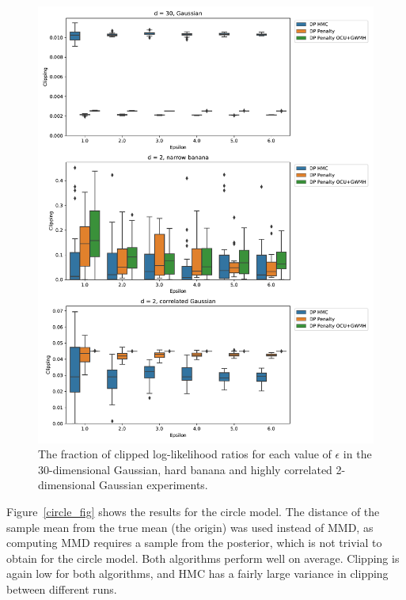 \documentclass[english,twoside,openright]{HYgraduMLDS}
\begin{document}
\begin{figure}
  \centering
  \includegraphics[width=\textwidth]{figures/banana_extra_clipping}
  \caption{
    The fraction of clipped log-likelihood ratios for each value of \(\epsilon\) in
    the 30-dimensional Gaussian, hard banana and highly correlated
    2-dimensional Gaussian experiments.
  }
  \label{banana_extra_clipping_fig}
\end{figure}

Figure~\ref{circle_fig} shows the results for the circle model. The distance
of the sample mean from the true mean (the origin) was used instead of MMD,
as computing MMD requires a sample from the posterior, which is not trivial
to obtain for the circle model. Both algorithms perform well on average.
Clipping is again low
for both algorithms, and HMC has a fairly large variance in clipping between
different runs.
\end{document}
